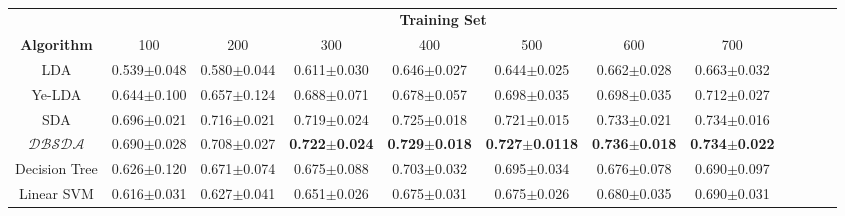 \documentclass{article}
\newcommand{\TheName}{$\mathcal{DBSDA}$}
\theoremstyle{plain}
\begin{document}
\begin{table*}
\caption{}
		\label{tab:table11}
\begin{center}
\scriptsize{
\begin{tabular}{*{12}{c}}
\toprule
    & \multicolumn{7}{c}{\textbf{Training Set}}\\
    \cmidrule(lr){2-8}
    \textbf{Algorithm}& 
    \multicolumn{1}{c}{100} &
    \multicolumn{1}{c}{200} &
    \multicolumn{1}{c}{300} &
    \multicolumn{1}{c}{400} &
     \multicolumn{1}{c}{500} &
     \multicolumn{1}{c}{600} &
     \multicolumn{1}{c}{700} \\




\cmidrule(lr){1-1}
\cmidrule(lr){2-2}
\cmidrule(lr){3-3}
\cmidrule(lr){4-4}
\cmidrule(lr){5-5}
\cmidrule(lr){6-6}
\cmidrule(lr){7-7}
\cmidrule(lr){8-8}
LDA&0.539$\pm$0.048&0.580$\pm$0.044&0.611$\pm$0.030&0.646$\pm$0.027&0.644$\pm$0.025&0.662$\pm$0.028&0.663$\pm$0.032\\

\cmidrule(lr){1-1}
\cmidrule(lr){2-2}
\cmidrule(lr){3-3}
\cmidrule(lr){4-4}
\cmidrule(lr){5-5}
\cmidrule(lr){6-6}
\cmidrule(lr){7-7}
\cmidrule(lr){8-8}
Ye-LDA&0.644$\pm$0.100&0.657$\pm$0.124&0.688$\pm$0.071&0.678$\pm$0.057&0.698$\pm$0.035&0.698$\pm$0.035&0.712$\pm$0.027\\

\cmidrule(lr){1-1}
\cmidrule(lr){2-2}
\cmidrule(lr){3-3}
\cmidrule(lr){4-4}
\cmidrule(lr){5-5}
\cmidrule(lr){6-6}
\cmidrule(lr){7-7}
\cmidrule(lr){8-8}
SDA&0.696$\pm$0.021&0.716$\pm$0.021&0.719$\pm$0.024&0.725$\pm$0.018&0.721$\pm$0.015&0.733$\pm$0.021&0.734$\pm$0.016\\


\cmidrule(lr){1-1}
\cmidrule(lr){2-2}
\cmidrule(lr){3-3}
\cmidrule(lr){4-4}
\cmidrule(lr){5-5}
\cmidrule(lr){6-6}
\cmidrule(lr){7-7}
\cmidrule(lr){8-8}
\textbf{\TheName} &0.690$\pm$0.028&0.708$\pm$0.027&\textbf{0.722$\pm$0.024}&\textbf{0.729$\pm$0.018}&\textbf{0.727$\pm$0.0118}&\textbf{0.736$\pm$0.018}&\textbf{0.734$\pm$0.022}\\




\cmidrule(lr){1-1}
\cmidrule(lr){2-2}
\cmidrule(lr){3-3}
\cmidrule(lr){4-4}
\cmidrule(lr){5-5}
\cmidrule(lr){6-6}
\cmidrule(lr){7-7}
\cmidrule(lr){8-8}
Decision Tree&0.626$\pm$0.120&0.671$\pm$0.074&0.675$\pm$0.088&0.703$\pm$0.032&0.695$\pm$0.034&0.676$\pm$0.078&0.690$\pm$0.097\\

\cmidrule(lr){1-1}
\cmidrule(lr){2-2}
\cmidrule(lr){3-3}
\cmidrule(lr){4-4}
\cmidrule(lr){5-5}
\cmidrule(lr){6-6}
\cmidrule(lr){7-7}
\cmidrule(lr){8-8}
Linear SVM&0.616$\pm$0.031&0.627$\pm$0.041&0.651$\pm$0.026&0.675$\pm$0.031&0.675$\pm$0.026&0.680$\pm$0.035&0.690$\pm$0.031\\



\end{tabular}}
\end{center}
\end{table*}
\end{document}
